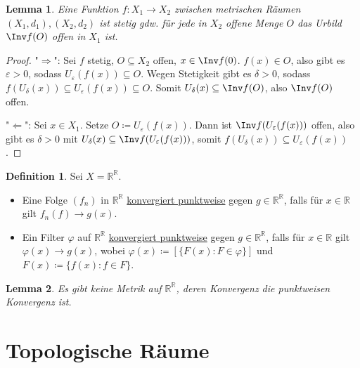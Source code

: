 \documentclass[12pt]{scrartcl}%
\newtheorem{lemma}{Lemma}
\theoremstyle{definition}
\newtheorem*{defn}{Definition}
\theoremstyle{remark}
\begin{document}
\begin{lemma}
    Eine Funktion $f: X_1\to X_2$ zwischen metrischen Räumen $(X_1, d_1), (X_2, d_2)$ ist stetig gdw. für jede in $X_2$ offene Menge $O$ das Urbild $\Inv f(O)$ offen in $X_1$ ist.
\end{lemma}

\begin{proof}
    "$\Rightarrow$": Sei $f$ stetig, $O \subseteq X_2$ offen, $x\in \Inv f(0)$. $f(x)\in O$, also gibt es $\varepsilon > 0$, sodass $U_\varepsilon(f(x)) \subseteq O$. Wegen Stetigkeit gibt es $\delta > 0$, sodass $f(U_\delta(x))\subseteq U_\varepsilon(f(x)) \subseteq O$. Somit $U_\delta(x)\subseteq \Inv f(O)$, also $\Inv f(O)$ offen.

    "$\Leftarrow$": Sei $x\in X_1$. Setze $O\coloneqq U_\varepsilon(f(x))$. Dann ist $\Inv f(U_\varepsilon(f(x)))$ offen, also gibt es $\delta > 0$ mit $U_\delta(x) \subseteq \Inv f(U_\varepsilon(f(x)))$, somit $f(U_\delta(x)) \subseteq U_\varepsilon(f(x))$.
\end{proof}

\begin{defn}
    Sei $X=\mathbb{R}^\mathbb{R}$. 
    
    \begin{itemize}
        \item Eine Folge $(f_n)$ in $\mathbb{R}^\mathbb{R}$ \underline{konvergiert punktweise} gegen $g\in \mathbb{R}^\mathbb{R}$, falls für $x\in \mathbb{R}$ gilt $f_n(f)\to g(x)$.
        \item Ein Filter $\varphi$ auf $\mathbb{R}^\mathbb{R}$ \underline{konvergiert punktweise} gegen $g\in \mathbb{R}^\mathbb{R}$, falls für $x\in \mathbb{R}$ gilt $\varphi(x)\to g(x)$, wobei $\varphi(x)\coloneqq [\{F(x): F\in\varphi\}]$ und $F(x)\coloneqq \{f(x): f\in F\}$.
    \end{itemize}
\end{defn}

\begin{lemma}
    Es gibt keine Metrik auf $\mathbb{R}^\mathbb{R}$, deren Konvergenz die punktweisen Konvergenz ist.
\end{lemma}

\section*{Topologische Räume}
\end{document}
